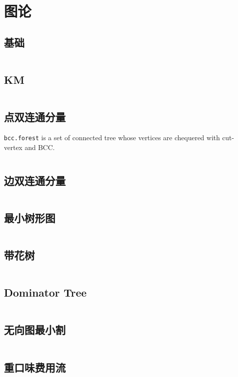 \chapter{图论}
\section{基础}
\inputminted{cpp}{\source/graph-theory/basis.cpp}
\section{KM}
\inputminted{cpp}{\source/graph-theory/KM.cpp}
\section{点双连通分量}
\texttt{bcc.forest} is a set of connected tree whose vertices are chequered with cut-vertex and BCC.
\inputminted{cpp}{\source/graph-theory/biconnected-graph-vertex.cpp}
\section{边双连通分量}
\inputminted{cpp}{\source/graph-theory/biconnected-graph-edge.cpp}
\section{最小树形图}
\inputminted{cpp}{\source/graph-theory/optimum-branching.cpp}
\section{带花树}
\inputminted{cpp}{\source/graph-theory/blossom-algorithm.cpp}
\section{Dominator Tree}
\inputminted{cpp}{\source/graph-theory/dominator-tree.cpp}
\section{无向图最小割}
\inputminted{cpp}{\source/graph-theory/stoer-wagner-algorithm.cpp}
\section{重口味费用流}
\inputminted{cpp}{\source/graph-theory/zkw-cost-flow.cpp}
